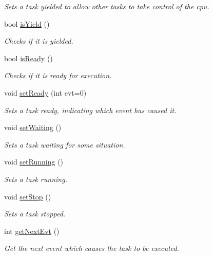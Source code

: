\begin{DoxyCompactItemize}
\begin{DoxyCompactList}\small\item\em Sets a task yielded to allow other tasks to take control of the cpu. \end{DoxyCompactList}\item 
bool \hyperlink{class_task_abf94fbac9e645727e9e4b8cc59119baf}{is\-Yield} ()
\begin{DoxyCompactList}\small\item\em Checks if it is yielded. \end{DoxyCompactList}\item 
bool \hyperlink{class_task_a52b1948265838893a03c3dc3aec48848}{is\-Ready} ()
\begin{DoxyCompactList}\small\item\em Checks if it is ready for execution. \end{DoxyCompactList}\item 
void \hyperlink{class_task_ad29f9fd753d6d805f651c1da2189ed9b}{set\-Ready} (int evt=0)
\begin{DoxyCompactList}\small\item\em Sets a task ready, indicating which event has caused it. \end{DoxyCompactList}\item 
\hypertarget{class_task_a47d3d52ab68ae011176985dea5503d31}{void \hyperlink{class_task_a47d3d52ab68ae011176985dea5503d31}{set\-Waiting} ()}\label{class_task_a47d3d52ab68ae011176985dea5503d31}

\begin{DoxyCompactList}\small\item\em Sets a task waiting for some situation. \end{DoxyCompactList}\item 
\hypertarget{class_task_a81ed7148858ae6af41d3b3e8dc88112e}{void \hyperlink{class_task_a81ed7148858ae6af41d3b3e8dc88112e}{set\-Running} ()}\label{class_task_a81ed7148858ae6af41d3b3e8dc88112e}

\begin{DoxyCompactList}\small\item\em Sets a task running. \end{DoxyCompactList}\item 
\hypertarget{class_task_ac9ac1f22bc2ca7552103d066db28ac4b}{void \hyperlink{class_task_ac9ac1f22bc2ca7552103d066db28ac4b}{set\-Stop} ()}\label{class_task_ac9ac1f22bc2ca7552103d066db28ac4b}

\begin{DoxyCompactList}\small\item\em Sets a task stopped. \end{DoxyCompactList}\item 
int \hyperlink{class_task_a1deaaa0d4e56202e5122f9acb4a49b90}{get\-Next\-Evt} ()
\begin{DoxyCompactList}\small\item\em Get the next event which causes the task to be executed. \end{DoxyCompactList}\end{DoxyCompactItemize}


